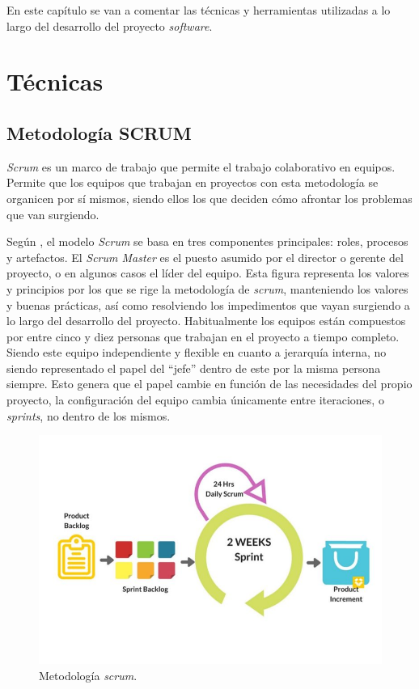 
En este capítulo se van a comentar las técnicas y herramientas utilizadas a lo largo del desarrollo del proyecto \textit{software}.

\section{Técnicas}\label{sec:tecnicas}

\subsection{Metodología SCRUM}
\textit{Scrum} es un marco de trabajo que permite el trabajo colaborativo en equipos. Permite que los equipos que trabajan en proyectos con esta metodología se organicen por sí mismos, siendo ellos los que deciden cómo afrontar los problemas que van surgiendo. 

Según \cite{cervone2011understanding}, el modelo \textit{Scrum} se basa en tres componentes principales: roles, procesos y artefactos. El \textit{Scrum Master} es el puesto asumido por el director o gerente del proyecto, o en algunos casos el líder del equipo. Esta figura representa los valores y principios por los que se rige la metodología de \textit{scrum}, manteniendo los valores y buenas prácticas, así como resolviendo los impedimentos que vayan surgiendo a lo largo del desarrollo del proyecto. Habitualmente los equipos están compuestos por entre cinco y diez personas que trabajan en el proyecto a tiempo completo. Siendo este equipo independiente y flexible en cuanto a jerarquía interna, no siendo representado el papel del ``jefe'' dentro de este por la misma persona siempre. Esto genera que el papel cambie en función de las necesidades del propio proyecto, la configuración del equipo cambia únicamente entre iteraciones, o \textit{sprints}, no dentro de los mismos.

\begin{figure}[]
	\centering
	\includegraphics[scale=0.5]{../img/anexos/overview-scrum}
	\caption{Metodología \textit{scrum}.}\label{img:scrum-overview}
\end{figure}

